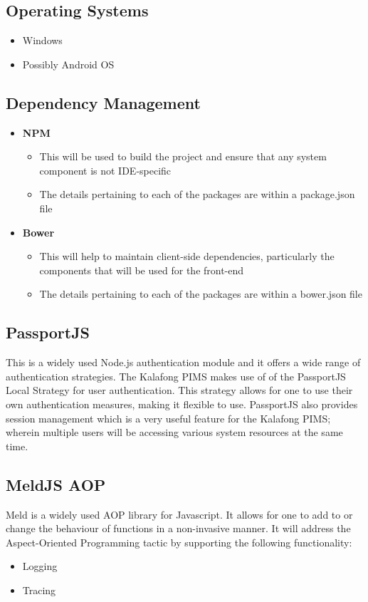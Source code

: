 \subsection{Operating Systems}
\begin{itemize}
	\item Windows
	\item Possibly Android OS
\end{itemize}

\subsection{Dependency Management}
\begin{itemize}
	\item \textbf{NPM}
		\begin{itemize}
			\item This will be used to build the project and ensure that any system component is not IDE-specific
			\item The details pertaining to each of the packages are within a package.json file				
		\end{itemize}
	\item \textbf{Bower}
		\begin{itemize}
			\item This will help to maintain client-side dependencies, particularly the components that will be used for the front-end
			\item The details pertaining to each of the packages are within a bower.json file				
		\end{itemize}	
\end{itemize}

\subsection{PassportJS}
This is a widely used Node.js authentication module and it offers a wide range of authentication strategies. The Kalafong PIMS makes use of of the PassportJS Local Strategy for user authentication. This strategy allows for one to use their own authentication measures, making it flexible to use. PassportJS also provides session management which is a very useful feature for the Kalafong PIMS; wherein multiple users will be accessing various system resources at the same time.

\subsection{MeldJS AOP}
Meld is a widely used AOP library for Javascript. It allows for one to add to or change the behaviour of functions in a  non-invasive manner. It will address the Aspect-Oriented Programming tactic by supporting the following functionality:
\begin{itemize}
	\item Logging
	\item Tracing				
\end{itemize}


